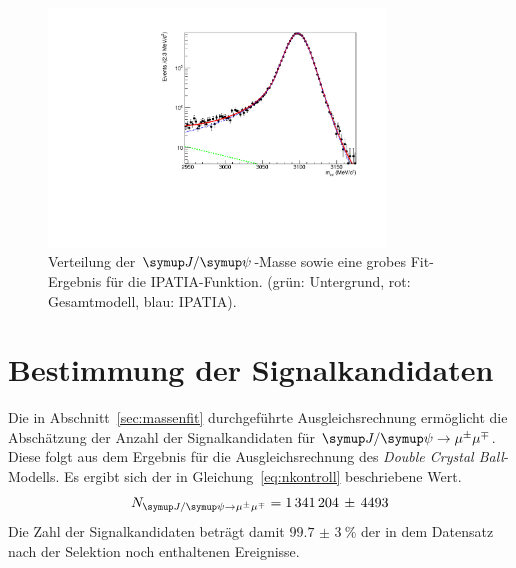 %
\begin{figure}[H]
  \centering
      \includegraphics[width=0.8\textwidth]{Plots/IPATIAexp.pdf}
  \caption{Verteilung der $\jpsi$-Masse sowie eine grobes Fit-Ergebnis für die IPATIA-Funktion. (grün: Untergrund, rot: Gesamtmodell, blau: IPATIA).}
  \label{fig:fit2}
\end{figure}
\section{Bestimmung der Signalkandidaten}
Die in Abschnitt~\ref{sec:massenfit} durchgeführte Ausgleichsrechnung ermöglicht die Abschätzung der Anzahl der Signalkandidaten für $\kontroll$. Diese folgt aus dem Ergebnis für die Ausgleichsrechnung des \textit{Double Crystal Ball}-Modells. Es ergibt sich der in Gleichung~\eqref{eq:nkontroll} beschriebene Wert.
%
\begin{equation}
  N_{\kontroll}=1\,341\,204\,\pm\,4493
  \label{eq:nkontroll}
\end{equation}
%
Die Zahl der Signalkandidaten beträgt damit $\SI{99,7(3)}{\percent}$ der in dem Datensatz nach der Selektion noch enthaltenen Ereignisse.
